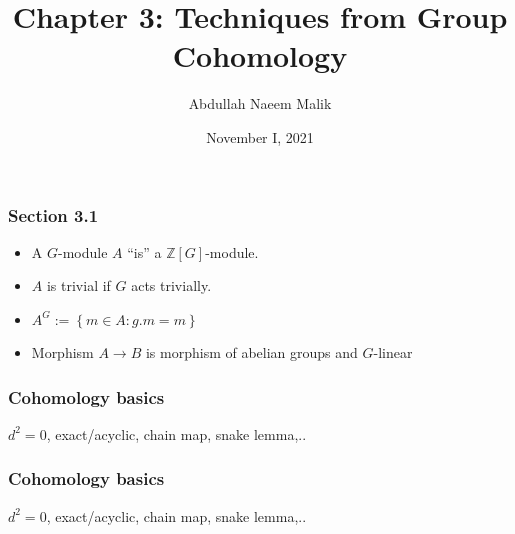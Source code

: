 \documentclass[10pt,xcolor=table,dvipsnames]{beamer}
\newenvironment{stepitemize}{\begin{itemize}[<+->]}{\end{itemize} }
\begin{document}
\title[Reading Group]{Chapter 3: Techniques from Group Cohomology}
\author{Abdullah Naeem Malik}
\date{November I, 2021}
\maketitle

\begin{frame}
    \frametitle{Section 3.1}
\begin{stepitemize}
\item A $G$-module $A$ ``is'' a $\mathbb{Z}\left[ G\right] $-module.
\item $A$ is trivial if $G$ acts trivially.
\item $A^{G}:=\left\{ m\in A:g.m=m\right\} $
\item Morphism $A \longrightarrow B$ is morphism of abelian groups and $G$-linear
\end{stepitemize}

\end{frame}

\begin{frame}
\frametitle{Cohomology basics}
$d^2 = 0$, exact/acyclic, chain map, snake lemma,..
\vspace{5.7cm}
\end{frame}

\begin{frame}[fragile]
\frametitle{Cohomology basics}
$d^2 = 0$, exact/acyclic, chain map, snake lemma,..
\vspace{1cm}
\begin{center}
\end{center}
\end{frame}
\end{document}
